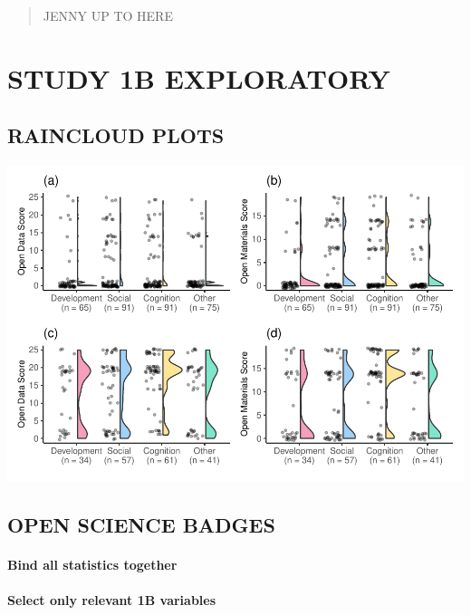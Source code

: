 \documentclass[
  english,
  man]{apa6}
\let\oldparagraph\paragraph
\renewcommand{\paragraph}[1]{\oldparagraph{#1}\mbox{}}
\begin{document}
\begin{quote}
JENNY UP TO HERE
\end{quote}

\hypertarget{study-1b-exploratory}{%
\section{STUDY 1B EXPLORATORY}\label{study-1b-exploratory}}

\hypertarget{raincloud-plots}{%
\subsection{RAINCLOUD PLOTS}\label{raincloud-plots}}

\includegraphics{icd_special_issue_files/figure-latex/1ab-rain-1.pdf}

\hypertarget{open-science-badges}{%
\subsection{OPEN SCIENCE BADGES}\label{open-science-badges}}

\hypertarget{bind-all-statistics-together}{%
\paragraph{Bind all statistics together}\label{bind-all-statistics-together}}

\hypertarget{select-only-relevant-1b-variables}{%
\paragraph{Select only relevant 1B variables}\label{select-only-relevant-1b-variables}}
\end{document}
